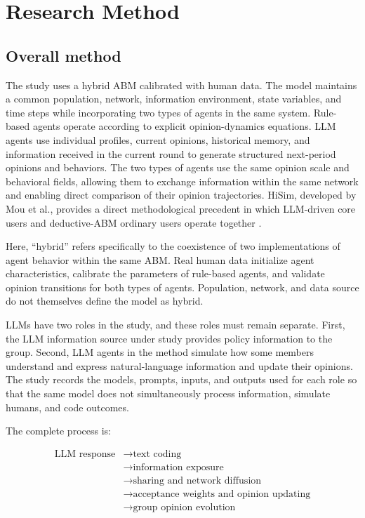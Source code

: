 \documentclass[11pt,a4paper]{article}
\begin{document}
\section{Research Method}

\subsection{Overall method}

The study uses a hybrid ABM calibrated with human data. The model maintains a common population, network, information environment, state variables, and time steps while incorporating two types of agents in the same system. Rule-based agents operate according to explicit opinion-dynamics equations. LLM agents use individual profiles, current opinions, historical memory, and information received in the current round to generate structured next-period opinions and behaviors. The two types of agents use the same opinion scale and behavioral fields, allowing them to exchange information within the same network and enabling direct comparison of their opinion trajectories. HiSim, developed by Mou et al., provides a direct methodological precedent in which LLM-driven core users and deductive-ABM ordinary users operate together \cite{mou2024}.

Here, ``hybrid'' refers specifically to the coexistence of two implementations of agent behavior within the same ABM. Real human data initialize agent characteristics, calibrate the parameters of rule-based agents, and validate opinion transitions for both types of agents. Population, network, and data source do not themselves define the model as hybrid.

LLMs have two roles in the study, and these roles must remain separate. First, the LLM information source under study provides policy information to the group. Second, LLM agents in the method simulate how some members understand and express natural-language information and update their opinions. The study records the models, prompts, inputs, and outputs used for each role so that the same model does not simultaneously process information, simulate humans, and code outcomes.

The complete process is:

\begin{equation*}
\begin{aligned}\text{LLM response} &\rightarrow \text{text coding} \\
&\rightarrow \text{information exposure} \\
&\rightarrow \text{sharing and network diffusion} \\
&\rightarrow \text{acceptance weights and opinion updating} \\
&\rightarrow \text{group opinion evolution}\end{aligned}
\end{equation*}
\end{document}
